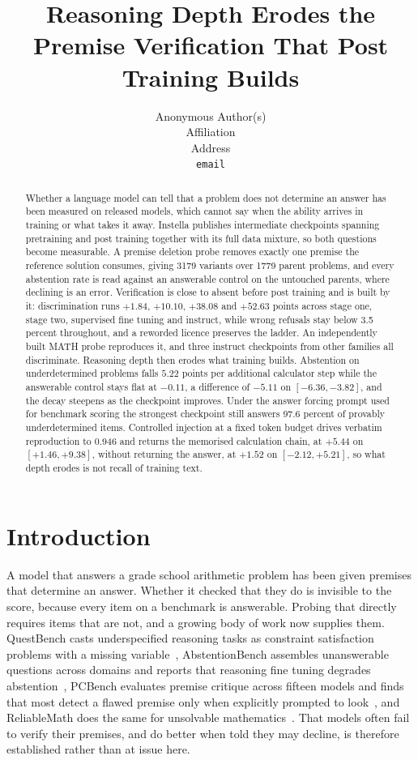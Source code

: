 \documentclass{article}
\title{Reasoning Depth Erodes the Premise Verification That Post Training Builds}
\author{%
  Anonymous Author(s) \\
  Affiliation \\
  Address \\
  \texttt{email} \\
}
\begin{document}
\maketitle

\begin{abstract}
Whether a language model can tell that a problem does not determine an answer has been
measured on released models, which cannot say when the ability arrives in training or what
takes it away. Instella publishes intermediate checkpoints spanning pretraining and post
training together with its full data mixture, so both questions become measurable. A premise
deletion probe removes exactly one premise the reference solution consumes, giving 3179
variants over 1779 parent problems, and every abstention rate is read against an answerable
control on the untouched parents, where declining is an error. Verification is close to absent
before post training and is built by it: discrimination runs $+1.84$, $+10.10$, $+38.08$ and
$+52.63$ points across stage one, stage two, supervised fine tuning and instruct, while wrong
refusals stay below 3.5 percent throughout, and a reworded licence preserves the ladder. An
independently built MATH probe reproduces it, and three instruct checkpoints from other
families all discriminate. Reasoning depth
then erodes what training builds. Abstention on underdetermined problems falls $5.22$ points
per additional calculator step while the answerable control stays flat at $-0.11$, a
difference of $-5.11$ on $[-6.36, -3.82]$, and the decay steepens as the checkpoint improves.
Under the answer forcing prompt used for benchmark scoring the strongest checkpoint still
answers 97.6 percent of provably underdetermined items. Controlled injection at a fixed token
budget drives verbatim reproduction to 0.946 and returns the memorised calculation chain, at
$+5.44$ on $[+1.46, +9.38]$, without returning the answer, at $+1.52$ on $[-2.12, +5.21]$, so
what depth erodes is not recall of training text.
\end{abstract}

\section{Introduction}

A model that answers a grade school arithmetic problem has been given premises that determine
an answer. Whether it checked that they do is invisible to the score, because every item on a
benchmark is answerable. Probing that directly requires items that are not, and a growing body
of work now supplies them. QuestBench casts underspecified reasoning tasks as constraint
satisfaction problems with a missing variable~\citep{li2025questbench}, AbstentionBench
assembles unanswerable questions across domains and reports that reasoning fine tuning
degrades abstention~\citep{kirichenko2025abstentionbench}, PCBench evaluates premise critique
across fifteen models and finds that most detect a flawed premise only when explicitly
prompted to look~\citep{li2025premisecritique}, and ReliableMath does the same for unsolvable
mathematics~\citep{xue2025reliablemath}. That models often fail to verify their premises, and
do better when told they may decline, is therefore established rather than at issue here.
\end{document}
